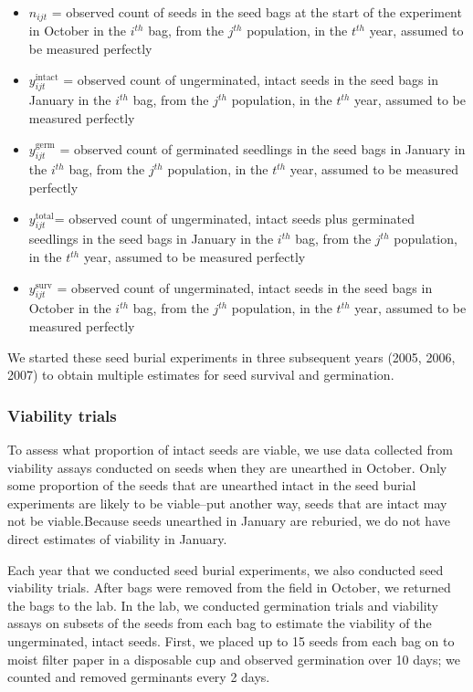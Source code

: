 \documentclass[12pt, oneside, titlepage]{article}   	%
\begin{document}
\begin{itemize}
	\item $n_{ijt}$ = observed count of seeds in the seed bags at the start of the experiment in October in the $i^{th}$ bag, from the $j^{th}$ population, in the $t^{th}$ year, assumed to be measured perfectly 
	\item $y^{\mathrm{intact}}_{ijt}$ = observed count of ungerminated, intact seeds in the seed bags in January in the $i^{th}$ bag, from the $j^{th}$ population, in the $t^{th}$ year,  assumed to be measured perfectly 
	\item $y^{\mathrm{germ}}_{ijt}$ = observed count of germinated seedlings in the seed bags in January in the $i^{th}$ bag, from the $j^{th}$ population, in the $t^{th}$ year, assumed to be measured perfectly 
	\item $y^{\mathrm{total}}_{ijt}$= observed count of ungerminated, intact seeds plus germinated seedlings in the seed bags in January in the $i^{th}$ bag, from the $j^{th}$ population, in the $t^{th}$ year, assumed to be measured perfectly 	
	\item $y^{\mathrm{surv}}_{ijt}$ = observed count of ungerminated, intact seeds in the seed bags in October in the $i^{th}$ bag, from the $j^{th}$ population, in the $t^{th}$ year, assumed to be measured perfectly 	
\end{itemize}

We started these seed burial experiments in three subsequent years (2005, 2006, 2007) to obtain multiple estimates for seed survival and germination. 

\subsubsection*{Viability trials}

To assess what proportion of intact seeds are viable, we use data collected from viability assays conducted on seeds when they are unearthed in October.  Only some proportion of the seeds that are unearthed intact in the seed burial experiments are likely to be viable--put another way, seeds that are intact may not be viable.Because seeds unearthed in January are reburied, we do not have direct estimates of viability in January.

Each year that we conducted seed burial experiments, we also conducted seed viability trials. After bags were removed from the field in October, we returned the bags to the lab. In the lab, we conducted germination trials and viability assays on subsets of the seeds from each bag to estimate the viability of the ungerminated, intact seeds. First, we placed up to 15 seeds from each bag on to moist filter paper in a disposable cup and observed germination over 10 days; we counted and removed germinants every 2 days. 
\end{document}
